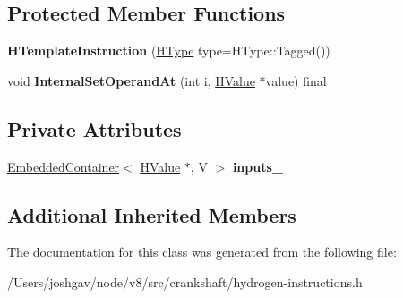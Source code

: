 \subsection*{Protected Member Functions}
\begin{DoxyCompactItemize}
\item 
{\bfseries H\+Template\+Instruction} (\hyperlink{classv8_1_1internal_1_1_h_type}{H\+Type} type=H\+Type\+::\+Tagged())\hypertarget{classv8_1_1internal_1_1_h_template_instruction_a3f74fa24ebbb1ff18db94e4e65f7fefe}{}\label{classv8_1_1internal_1_1_h_template_instruction_a3f74fa24ebbb1ff18db94e4e65f7fefe}

\item 
void {\bfseries Internal\+Set\+Operand\+At} (int i, \hyperlink{classv8_1_1internal_1_1_h_value}{H\+Value} $\ast$value) final\hypertarget{classv8_1_1internal_1_1_h_template_instruction_a4bde0da1f68fa91744fd1cdab0e36b2c}{}\label{classv8_1_1internal_1_1_h_template_instruction_a4bde0da1f68fa91744fd1cdab0e36b2c}

\end{DoxyCompactItemize}
\subsection*{Private Attributes}
\begin{DoxyCompactItemize}
\item 
\hyperlink{classv8_1_1internal_1_1_embedded_container}{Embedded\+Container}$<$ \hyperlink{classv8_1_1internal_1_1_h_value}{H\+Value} $\ast$, V $>$ {\bfseries inputs\+\_\+}\hypertarget{classv8_1_1internal_1_1_h_template_instruction_a784fd8aabc9e431e3d1654260fab78ff}{}\label{classv8_1_1internal_1_1_h_template_instruction_a784fd8aabc9e431e3d1654260fab78ff}

\end{DoxyCompactItemize}
\subsection*{Additional Inherited Members}


The documentation for this class was generated from the following file\+:\begin{DoxyCompactItemize}
\item 
/\+Users/joshgav/node/v8/src/crankshaft/hydrogen-\/instructions.\+h\end{DoxyCompactItemize}
